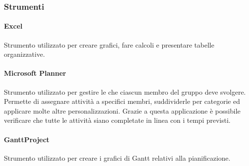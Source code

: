 \subsubsection{Strumenti}
\paragraph{Excel}
Strumento utilizzato per creare grafici, fare calcoli e presentare tabelle organizzative.
\paragraph{Microsoft Planner}
Strumento utilizzato per gestire le  che ciascun membro del gruppo deve svolgere. Permette di assegnare attività a specifici membri, suddividerle per categorie ed applicare molte altre personalizzazioni. Grazie a questa applicazione è possibile verificare che tutte le attività siano completate in linea con i tempi previsti.
\paragraph{GanttProject}
Strumento utilizzato per creare i grafici di Gantt relativi alla pianificazione.